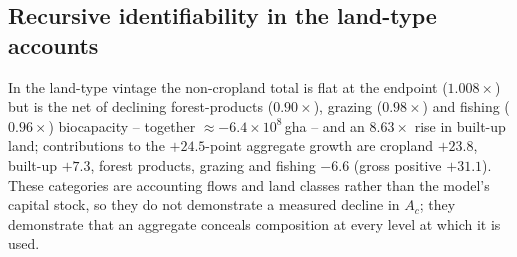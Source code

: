 \subsection{Recursive identifiability in the land-type accounts}\label{si:recursive}

In the land-type vintage the non-cropland total is flat at the endpoint ($1.008\times$) but is the net of declining forest-products ($0.90\times$), grazing ($0.98\times$) and fishing ($0.96\times$) biocapacity -- together $\approx-6.4\times10^{8}$\,gha -- and an $8.63\times$ rise in built-up land; contributions to the $+24.5$-point aggregate growth are cropland $+23.8$, built-up $+7.3$, forest products, grazing and fishing $-6.6$ (gross positive $+31.1$). These categories are accounting flows and land classes rather than the model's capital stock, so they do not demonstrate a measured decline in $A_c$; they demonstrate that an aggregate conceals composition at every level at which it is used.

